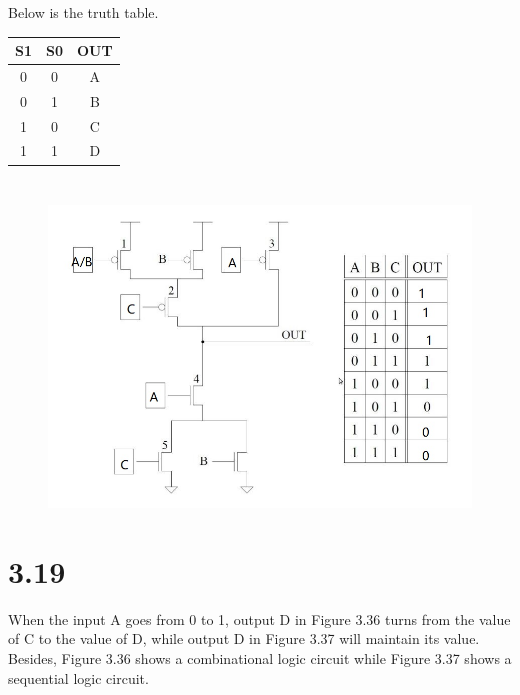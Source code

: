 \documentclass[11pt,a4paper]{article}
\begin{document}
	Below is the truth table.\par
	\begin{tabular}{|c|c|c|}
		\hline 
		S1 & S0 & OUT \\ 
		\hline 
		0 & 0 & A \\ 
		\hline 
		0 & 1 & B \\ 
		\hline 
		1 & 0 & C \\ 
		\hline 
		1 & 1 & D \\ 
		\hline 
	\end{tabular} 
	
	\section{}	
	\begin{figure}[H]
		\centering
		\includegraphics[width=1\linewidth]{3.jpg}
		\label{3}
	\end{figure}

	
	\section{3.19}
	When the input A goes from 0 to 1, output D in Figure 3.36 turns from the value of C to the value of D, while output D in Figure 3.37 will maintain its value. Besides, Figure 3.36 shows a combinational logic circuit while Figure 3.37 shows a sequential logic circuit.
	
\end{document}
